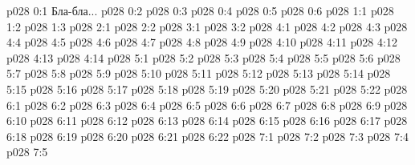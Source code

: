 \author{Могущественный Посланник}
\vs p028 0:1  Бла-бла...
\vs p028 0:2 \pc 
\vs p028 0:3 
\vs p028 0:4 
\vs p028 0:5 
\vs p028 0:6 \pc 
{}
\vs p028 1:1 
\vs p028 1:2 
\vs p028 1:3 
\vs p028 2:1 
\vs p028 2:2 
\vs p028 3:1 
\vs p028 3:2 
\vs p028 4:1 
\vs p028 4:2 
\vs p028 4:3 \pc 
\vs p028 4:4 
\vs p028 4:5 
\vs p028 4:6 
\vs p028 4:7 
\vs p028 4:8 
\vs p028 4:9 
\vs p028 4:10 
\vs p028 4:11 
\vs p028 4:12 
\vs p028 4:13 
\vs p028 4:14 
\vs p028 5:1 
\vs p028 5:2 \pc 
\vs p028 5:3 
\vs p028 5:4 
\vs p028 5:5 
\vs p028 5:6 \pc 
\vs p028 5:7 
\vs p028 5:8 
\vs p028 5:9 
\vs p028 5:10 
\vs p028 5:11 
\vs p028 5:12 
\vs p028 5:13 
\vs p028 5:14 \pc 
\vs p028 5:15 
\vs p028 5:16 
\vs p028 5:17 
\vs p028 5:18 
\vs p028 5:19 
\vs p028 5:20 
\vs p028 5:21 
\vs p028 5:22 
\vs p028 6:1 
\vs p028 6:2 
\vs p028 6:3 
\vs p028 6:4 
\vs p028 6:5 
\vs p028 6:6 
\vs p028 6:7 
\vs p028 6:8 \pc 
\vs p028 6:9 
\vs p028 6:10 
\vs p028 6:11 
\vs p028 6:12 
\vs p028 6:13 
\vs p028 6:14 
\vs p028 6:15 \pc 
\vs p028 6:16 
\vs p028 6:17 
\vs p028 6:18 \pc 
\vs p028 6:19 \pc 
\vs p028 6:20 
\vs p028 6:21 
\vs p028 6:22 
\vs p028 7:1 
\vs p028 7:2 \pc 
\vs p028 7:3 
\vs p028 7:4 
\vsetoff
\vs p028 7:5 
\quizlink
